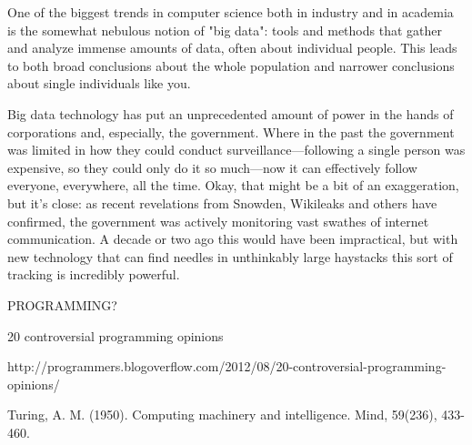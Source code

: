 \documentclass{article}
\begin{document}
One of the biggest trends in computer science both in industry and in
academia is the somewhat nebulous notion of "big data": tools and
methods that gather and analyze immense amounts of data, often about
individual people. This leads to both broad conclusions about the
whole population and narrower conclusions about single individuals
like you.

Big data technology has put an unprecedented amount of power in the
hands of corporations and, especially, the government. Where in the
past the government was limited in how they could conduct
surveillance—following a single person was expensive, so they could
only do it so much—now it can effectively follow everyone, everywhere,
all the time. Okay, that might be a bit of an exaggeration, but it's
close: as recent revelations from Snowden, Wikileaks and others have
confirmed, the government was actively monitoring vast swathes of
internet communication. A decade or two ago this would have been
impractical, but with new technology that can find needles in
unthinkably large haystacks this sort of tracking is incredibly
powerful.

PROGRAMMING?

20 controversial programming opinions

http://programmers.blogoverflow.com/2012/08/20-controversial-programming-opinions/




\begin{thebibliography}


 Turing, A. M. (1950). Computing machinery and intelligence. Mind, 59(236), 433-460.

\end{thebibliography}
\end{document}
